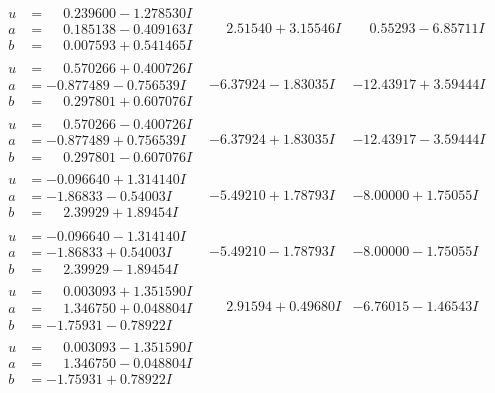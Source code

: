 \documentclass[1p]{elsarticle_modified}
\theoremstyle{definition}
\begin{document}
$$\begin{array}{c|c|c}
\begin{aligned}
u &= \phantom{-}0.239600 - 1.278530 I \\
a &= \phantom{-}0.185138 - 0.409163 I \\
b &= \phantom{-}0.007593 + 0.541465 I\end{aligned}
 & \phantom{-}2.51540 + 3.15546 I & \phantom{-}0.55293 - 6.85711 I \\ \hline\begin{aligned}
u &= \phantom{-}0.570266 + 0.400726 I \\
a &= -0.877489 - 0.756539 I \\
b &= \phantom{-}0.297801 + 0.607076 I\end{aligned}
 & -6.37924 - 1.83035 I & -12.43917 + 3.59444 I \\ \hline\begin{aligned}
u &= \phantom{-}0.570266 - 0.400726 I \\
a &= -0.877489 + 0.756539 I \\
b &= \phantom{-}0.297801 - 0.607076 I\end{aligned}
 & -6.37924 + 1.83035 I & -12.43917 - 3.59444 I \\ \hline\begin{aligned}
u &= -0.096640 + 1.314140 I \\
a &= -1.86833 - 0.54003 I \\
b &= \phantom{-}2.39929 + 1.89454 I\end{aligned}
 & -5.49210 + 1.78793 I & -8.00000 + 1.75055 I \\ \hline\begin{aligned}
u &= -0.096640 - 1.314140 I \\
a &= -1.86833 + 0.54003 I \\
b &= \phantom{-}2.39929 - 1.89454 I\end{aligned}
 & -5.49210 - 1.78793 I & -8.00000 - 1.75055 I \\ \hline\begin{aligned}
u &= \phantom{-}0.003093 + 1.351590 I \\
a &= \phantom{-}1.346750 + 0.048804 I \\
b &= -1.75931 - 0.78922 I\end{aligned}
 & \phantom{-}2.91594 + 0.49680 I & -6.76015 - 1.46543 I \\ \hline\begin{aligned}
u &= \phantom{-}0.003093 - 1.351590 I \\
a &= \phantom{-}1.346750 - 0.048804 I \\
b &= -1.75931 + 0.78922 I\end{aligned}

\end{array}$$
\end{document}
